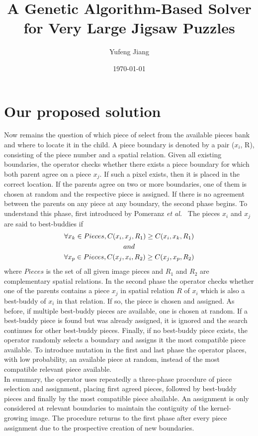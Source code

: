 \documentclass[10pt,twocolumn,letterpaper]{article}
\begin{document}
\title{A Genetic Algorithm-Based Solver for Very Large Jigsaw Puzzles
}
\author{Yufeng Jiang}
\date{\today}
\maketitle
\section{Our proposed solution}
Now remains the question of which piece of select from the available pieces bank and where to locate it in the child. A piece boundary is denoted by a pair ($x_i$, R), consisting of the piece number and a spatial relation. Given all existing boundaries, the operator checks whether there exists a piece boundary for which both parent agree on a piece $x_j$. If such a pixel exists, then it is placed in the correct location. If the parents agree on two or more boundaries, one of them is chosen at random and the respective piece is assigned. If there is no agreement between the parents on any piece at any boundary, the second phase begins. To understand this phase, first introduced by Pomeranz \emph{et al.}~\cite{Fully} The pieces $x_i$ and $x_j$ are said to best-buddies if 
\begin{gather}
\forall x_k \in Pieces, C(x_i, x_j, R_1)\ge C(x_i, x_k, R_1) \\
and \notag \\
\forall x_p \in Pieces, C(x_j, x_i, R_2) \ge C(x_j, x_p, R_2)
\end{gather}
where $Pieces$ is the set of all given image pieces and $R_1$ and $R_2$ are complementary spatial relations. In the second phase the operator checks whether one of the parents contains a piece $x_j$ in spatial relation $R$ of $x_i$ which is also a best-buddy of $x_i$ in that relation. If so, the piece is chosen and assigned. As before, if multiple best-buddy pieces are available, one is chosen at random. If a best-buddy piece is found but was already assigned, it is ignored and the search continues for other best-buddy pieces. Finally, if no best-buddy piece exists, the operator randomly selects a boundary and assigns it the most compatible piece available. To introduce mutation in the first and last phase the operator places, with low probability, an available piece at random, instead of the most compatible relevant piece available.\\
\indent In summary, the operator uses repeatedly a three-phase procedure of piece selection and assignment, placing first agreed pieces, followed by best-buddy pieces and finally by the most compatible piece abailable. An assignment is only considered at relevant boundaries to maintain the contiguity of the kernel-growing image. The procedure returns to the first phase after every piece assignment due to the prospective creation of new boundaries. \\
\end{document}
